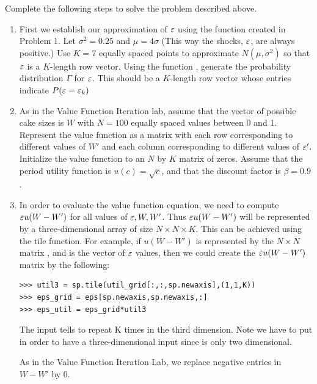 \begin{problem}
Complete the following steps to solve the problem described above.
\begin{enumerate}
   \item First we establish our approximation of $\varepsilon$ using the  function created in Problem 1. 
   Let $\sigma^2 = 0.25$ and $\mu=4\sigma$ (This way the shocks, $\varepsilon$, are always positive.) 
   Use $K=7$ equally spaced points to approximate $N(\mu,\sigma^2)$ so that $\varepsilon$ is a $K$-length row vector.  
   Using the function , generate the probability distribution $\Gamma$ for $\varepsilon$. 
   This should be a $K$-length row vector whose entries indicate $P(\varepsilon = \varepsilon_k)$

   \item As in the Value Function Iteration lab, assume that the vector of possible cake sizes is $W$ 
   with $N=100$ equally spaced values between 0 and 1.  Represent the value function as a matrix with each 
   row corresponding to different values of $W'$ and each column corresponding to different values of $\varepsilon'$. 
   Initialize the value function to an $N$ by $K$ matrix of zeros.  Assume that the period utility function is
    $u(c)=\sqrt{c}$, and that the discount factor is $\beta = 0.9$.


   \item In order to evaluate the value function equation, we need to compute $\varepsilon u(W-W')$ for all values of 
   $\varepsilon,W,W'$.  Thus $\varepsilon u(W-W')$ will be represented by a three-dimensional array of size $N\times N\times K$.
     This can be achieved using the tile function.  For example, if $u(W-W')$ is represented by the $N\times N$
      matrix , and  is the vector of $\varepsilon$ values, then we could create the 
      $\varepsilon u(W-W')$ matrix by the following:

\begin{lstlisting}
>>> util3 = sp.tile(util_grid[:,:,sp.newaxis],(1,1,K))
>>> eps_grid = eps[sp.newaxis,sp.newaxis,:]
>>> eps_util = eps_grid*util3
\end{lstlisting}

       The input  tells  to repeat  K times in the third dimension.  
       Note we have to put  in order to have a three-dimensional input since 
        is only two dimensional.

       As in the Value Function Iteration Lab, we replace negative entries in $W-W'$ by 0.


\end{enumerate}
\end{problem}
